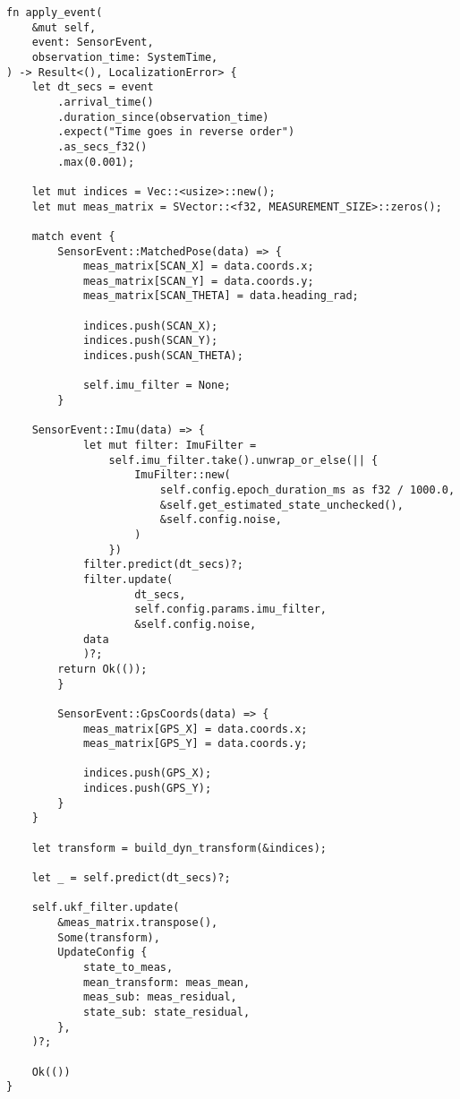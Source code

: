 \begin{lstlisting}
fn apply_event(
    &mut self,
    event: SensorEvent,
    observation_time: SystemTime,
) -> Result<(), LocalizationError> {
    let dt_secs = event
        .arrival_time()
        .duration_since(observation_time)
        .expect("Time goes in reverse order")
        .as_secs_f32()
        .max(0.001);

    let mut indices = Vec::<usize>::new();
    let mut meas_matrix = SVector::<f32, MEASUREMENT_SIZE>::zeros();

    match event {
        SensorEvent::MatchedPose(data) => {
            meas_matrix[SCAN_X] = data.coords.x;
            meas_matrix[SCAN_Y] = data.coords.y;
            meas_matrix[SCAN_THETA] = data.heading_rad;

            indices.push(SCAN_X);
            indices.push(SCAN_Y);
            indices.push(SCAN_THETA);

            self.imu_filter = None;
        }

	SensorEvent::Imu(data) => {
            let mut filter: ImuFilter =
                self.imu_filter.take().unwrap_or_else(|| {
                    ImuFilter::new(
                        self.config.epoch_duration_ms as f32 / 1000.0,
                        &self.get_estimated_state_unchecked(),
                        &self.config.noise,
                    )
                })
            filter.predict(dt_secs)?;
            filter.update(
                    dt_secs,
                    self.config.params.imu_filter,
                    &self.config.noise,
		    data
            )?;
	    return Ok(());
        }

        SensorEvent::GpsCoords(data) => {
            meas_matrix[GPS_X] = data.coords.x;
            meas_matrix[GPS_Y] = data.coords.y;

            indices.push(GPS_X);
            indices.push(GPS_Y);
        }
    }

    let transform = build_dyn_transform(&indices);

    let _ = self.predict(dt_secs)?;

    self.ukf_filter.update(
        &meas_matrix.transpose(),
        Some(transform),
        UpdateConfig {
            state_to_meas,
            mean_transform: meas_mean,
            meas_sub: meas_residual,
            state_sub: state_residual,
        },
    )?;

    Ok(())
}

\end{lstlisting}


